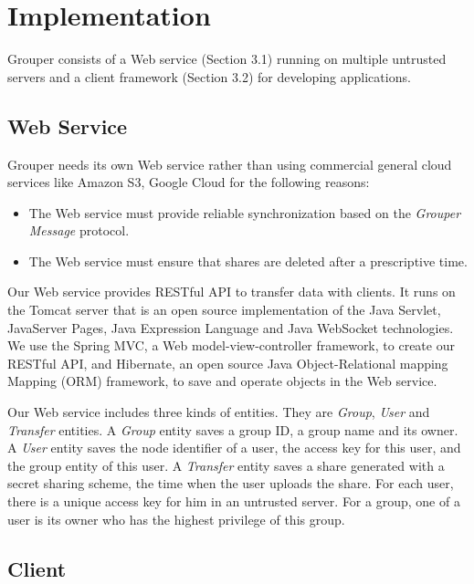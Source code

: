 \documentclass[twocolumn,10pt]{article}
\begin{document}
\section{Implementation}

Grouper consists of a Web service (Section 3.1) running on multiple untrusted servers and a client framework (Section 3.2) for developing applications.

\subsection{Web Service}

Grouper needs its own Web service rather than using commercial general cloud services like Amazon S3, Google Cloud for the following reasons:

\begin{itemize}
	\setlength{\itemsep}{1pt}
	\setlength{\parskip}{0pt}
	\setlength{\parsep}{0pt}
	\item The Web service must provide reliable synchronization based on the \emph{Grouper Message} protocol.
	\item The Web service must ensure that shares are deleted after a prescriptive time.
\end{itemize}

Our Web service provides RESTful API to transfer data with clients. 
It runs on the Tomcat server that is an open source implementation of the Java Servlet, JavaServer Pages, Java Expression Language and Java WebSocket technologies. 
We use the Spring MVC, a  Web model-view-controller framework, to create our RESTful API, and Hibernate, an open source Java Object-Relational mapping Mapping (ORM) framework, to save and operate objects in the Web service. 

Our Web service includes three kinds of entities. 
They are \emph{Group}, \emph{User} and \emph{Transfer} entities. 
A \emph{Group} entity saves a group ID, a group name and its owner. 
A \emph{User} entity saves the node identifier of a user, the access key for this user, and the group entity of this user. 
A \emph{Transfer} entity saves a share generated with a secret sharing scheme, the time when the user uploads the share. 
For each user, there is a unique access key for him in an untrusted server. For a group, one of a user is its owner who has the highest privilege of this group.

\subsection{Client}
\end{document}
